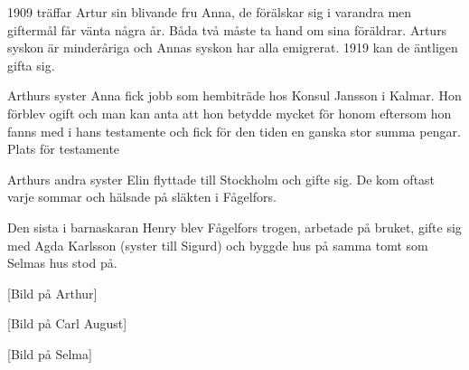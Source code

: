 1909 träffar Artur sin blivande fru Anna, de förälskar sig i varandra men giftermål får vänta några år. Båda två måste ta hand om sina föräldrar. Arturs syskon är minderåriga och Annas syskon har alla emigrerat.
1919 kan de äntligen gifta sig.

Arthurs syster Anna fick jobb som hembiträde hos Konsul Jansson i Kalmar. Hon förblev ogift och man kan anta att hon betydde mycket för honom eftersom hon fanns med i hans testamente och fick för den tiden en ganska stor summa pengar.
Plats för testamente

Arthurs andra syster Elin flyttade till Stockholm och gifte sig. De kom oftast varje sommar och hälsade på släkten i Fågelfors.

Den sista i barnaskaran Henry blev Fågelfors trogen, arbetade på bruket, gifte sig med Agda Karlsson (syster till Sigurd) och byggde hus på samma tomt som Selmas hus stod på. 



[Bild på Arthur]

[Bild på Carl August]

[Bild på Selma]

